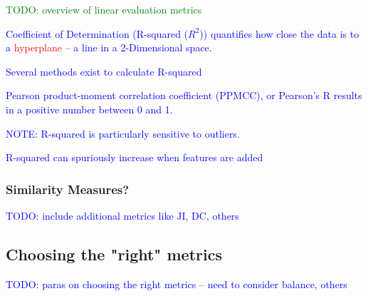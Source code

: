 \textcolor{green}{TODO: overview of linear evaluation metrics}

\textcolor{blue}{Coefficient of Determination (R-squared ($R^2$)) quantifies how close the data is to a \textcolor{red}{hyperplane} -- a line in a 2-Dimensional space.}

\textcolor{blue}{Several methods exist to calculate R-squared}

\textcolor{blue}{Pearson product-moment correlation coefficient (PPMCC), or {Pearson's R} results in a positive number between 0 and 1.}

\textcolor{blue}{NOTE: R-squared is particularly sensitive to outliers.}

\textcolor{blue}{R-squared can spuriously increase when features are added}

\subsubsection{Similarity Measures?}

\textcolor{blue}{TODO: include additional metrics like JI, DC, others}

\subsection{Choosing the "right" metrics}

\textcolor{blue}{TODO: paras on choosing the right metrics -- need to consider balance, others}

